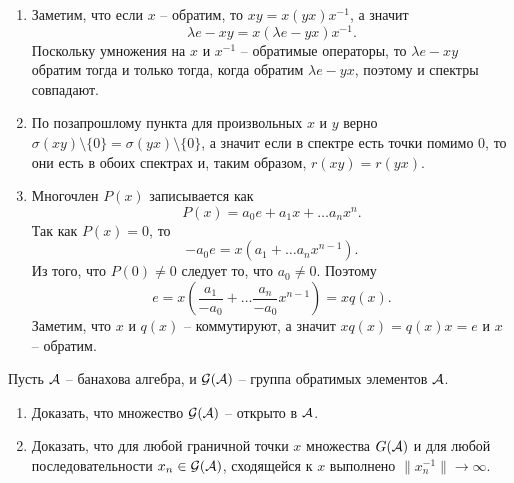 \begin{solution}
\begin{enumerate}
        \item Заметим, что если $x$ -- обратим, то $xy = x(yx)x^{-1}$, а значит
        \[
            \lambda e - xy = x( \lambda e - yx)x^{-1}.
        \]
        Поскольку умножения на $x$ и $x^{-1}$ -- обратимые операторы, то $\lambda e - xy$ обратим тогда и только тогда, когда обратим $\lambda e - yx$, поэтому и спектры совпадают.
        \item По позапрошлому пункта для произвольных $x$ и $y$ верно $\sigma(xy) \setminus\{0\} = \sigma(yx) \setminus\{0\}$, а значит если в спектре есть точки помимо $0$, то они есть в обоих спектрах и, таким образом, $r(xy) = r(yx)$.
        \item Многочлен $P(x)$ записывается как
        \[
            P(x) = a_0e + a_1x + \ldots a_n x^n.
        \]
        Так как $P(x) = 0$, то
        \[
            -a_0 e = x(a_1 + \ldots a_n x^{n - 1}).
        \]
        Из того, что $P(0) \neq 0$ следует то, что $a_0 \neq 0$.
        Поэтому 
        \[
            e = x\left(\frac{a_1}{-a_0} + \ldots \frac{a_n}{-a_0}x^{n - 1}\right) = x q(x).
        \]
        Заметим, что $x$ и $q(x)$ -- коммутируют, а значит $xq(x) = q(x)x = e$ и $x$ -- обратим.
    \end{enumerate}
\end{solution}
\begin{task}[T2]
    Пусть $\mathcal{A}$ -- банахова алгебра, и $\mathcal{G}(\mathcal{A})$ -- группа обратимых элементов $\mathcal{A}$.
    \begin{enumerate}
        \item Доказать, что множество $\mathcal{G}(\mathcal{A})$ -- открыто в $\mathcal{A}$.
        \item Доказать, что для любой граничной точки $x$ множества $G(\mathcal{A})$ и для любой последовательности $x_n \in \mathcal{G}(\mathcal{A})$, сходящейся к $x$ выполнено $\|x_n^{-1}\| \rightarrow \infty$.
    \end{enumerate}
\end{task}
